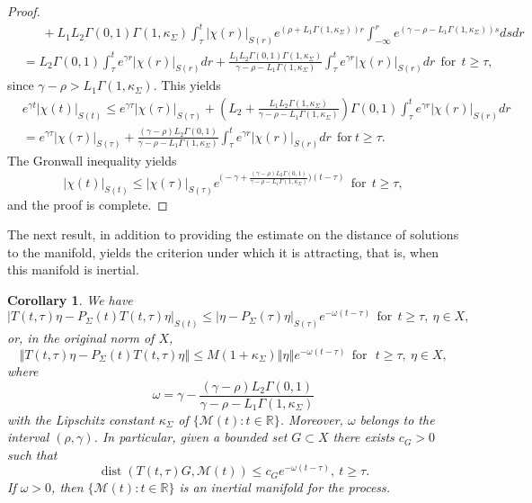 \documentclass[a4paper,11pt,reqno]{amsart}
\theoremstyle{plain}
\newtheorem{cor}[lem]{Corollary}
\theoremstyle{definition}
\numberwithin{equation}{section}
\newcommand{\R}{\mathbb{R}}
\newcommand{\calm}{\mathcal M}
\newcommand{\norm}[1]{\left\Vert#1\right\Vert}
\newcommand{\dist}{\operatorname{dist}}
\renewcommand{\geq}{\geqslant}
\renewcommand{\leq}{\leqslant}
\begin{document}
\begin{proof}
\begin{align*}
&\ \ \ \ \ \ \ +L_1L_2\Gamma(0,1)\Gamma(1,\kappa_\Sigma)\int_{\tau}^{t}|\chi(r)|_{S(r)}e^{(\rho+L_1\Gamma(1,\kappa_\Sigma))r}\int_{-\infty}^{r} e^{(\gamma -\rho-L_1\Gamma(1,\kappa_\Sigma))s}dsdr\\
&=L_2\Gamma(0,1)\int_{\tau}^{t} e^{\gamma r}|\chi(r)|_{S(r)}dr+\frac{L_1L_2\Gamma(0,1)\Gamma(1,\kappa_\Sigma)}{\gamma-\rho-L_1\Gamma(1,\kappa_\Sigma)}\int_{\tau}^{t}e^{\gamma r}|\chi(r)|_{S(r)}dr\ \ \text{for}\ \  t\geq\tau,
\end{align*}
since $\gamma-\rho> L_1\Gamma(1,\kappa_\Sigma)$.
This yields
\begin{align*}
	& e^{\gamma t}|\chi(t)|_{S(t)}\leq e^{\gamma\tau}|\chi(\tau)|_{S(\tau)}+\left(L_2 +\frac{L_1L_2\Gamma(1,\kappa_\Sigma)}{\gamma-\rho-L_1\Gamma(1,\kappa_\Sigma)}\right)\Gamma(0,1)\int_{\tau}^{t}e^{\gamma r}|\chi(r)|_{S(r)}dr\\
	& = e^{\gamma\tau}|\chi(\tau)|_{S(\tau)}+\frac{(\gamma-\rho)L_2\Gamma(0,1)}{\gamma-\rho-L_1\Gamma(1,\kappa_\Sigma)}\int_{\tau}^{t}e^{\gamma r}|\chi(r)|_{S(r)}dr \ \ \text{for}\  t\geq\tau.
	\end{align*}
The Gronwall inequality yields
$$|\chi(t)|_{S(t)}\leq |\chi(\tau)|_{S(\tau)}e^{\bigl(-\gamma+\frac{(\gamma-\rho)L_2\Gamma(0,1)}{\gamma-\rho-L_1\Gamma(1,\kappa_\Sigma)}\bigr)(t-\tau)}\ \ \text{for}\ \  t\geq\tau,$$
and the proof is complete.
\end{proof}

The next result, in addition to providing the estimate on the distance of solutions to the manifold, yields the criterion under which it is attracting, that is, when this manifold is inertial. 

\begin{cor}\label{cor:POSINV}
We have
\begin{equation}\label{e:error_repeated}
|T(t,\tau)\eta-P_\Sigma(t)T(t,\tau)\eta|_{S(t)}\leq |\eta-P_\Sigma(\tau)\eta|_{S(\tau)}e^{-\omega(t-\tau)}\ \ \text{for}\ \  t\geq\tau,\ \eta\in X,
\end{equation}
or, in the original norm of $X$,
\begin{equation}\label{e:ESTFORWARD2M}
\norm{T(t,\tau)\eta-P_\Sigma(t)T(t,\tau)\eta}\leq M(1+\kappa_\Sigma)\norm{\eta}e^{-\omega(t-\tau)}\ \ \text{for}\ \  \ t\geq\tau,\ \eta\in X,
\end{equation}
where
\begin{equation}\label{e:DEFNOMEGA}
\omega=\gamma-\frac{(\gamma-\rho)L_2\Gamma(0,1)}{\gamma-\rho-L_1\Gamma(1,\kappa_\Sigma)}
\end{equation}
with the Lipschitz constant $\kappa_\Sigma$ of $\{ \calm(t)\colon t\in \R\}$. Moreover, $\omega$ belongs to the interval $(\rho,\gamma)$.
In particular, given a bounded set $G\subset X$ there exists $c_{G}>0$ such that
\begin{equation*}%
\dist(T(t,\tau)G,\calm(t))\leq c_{G}e^{-\omega(t-\tau)},\ t\geq\tau.
\end{equation*}
If $\omega>0$, then $\{\calm(t)\colon t\in\R\}$ is an inertial manifold for the process. 
\end{cor}
\end{document}
